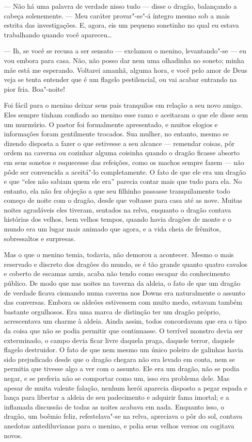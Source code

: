 --- Não há uma palavra de verdade nisso tudo --- disse o dragão,
balançando a cabeça solenemente. --- Meu caráter provar"-se"-á íntegro
mesmo sob a mais estrita das investigações. E, agora, eis um pequeno
sonetinho no qual eu estava trabalhando quando você apareceu\ldots{}

--- Ih, se você se recusa a ser sensato --- exclamou o menino,
levantando"-se --- eu vou embora para casa. Não, não posso dar nem uma
olhadinha no soneto; minha mãe está me esperando. Voltarei
amanhã, alguma hora, e você pelo amor de Deus veja se tenta entender
que é um flagelo pestilencial, ou vai acabar entrando na pior fria.
Boa"-noite!

Foi fácil para o menino deixar seus pais tranquilos em relação a seu
novo amigo. Eles sempre tinham confiado ao menino esse ramo e
aceitaram o que ele disse sem um murmúrio. O pastor foi formalmente
apresentado, e muitos elogios e informações foram gentilmente
trocados. Sua mulher, no entanto, mesmo se dizendo disposta a fazer o
que estivesse a seu alcance --- remendar coisas, pôr ordem na caverna
ou cozinhar alguma coisinha quando o dragão ficasse absorto em seus
sonetos e esquecesse das refeições, como os machos sempre fazem --- não
pôde ser convencida a aceitá"-lo completamente. O fato de que ele era
um dragão e que “eles não sabiam quem ele era” parecia contar mais
que tudo para ela. No entanto, ela não fez objeção a que seu filhinho
passasse tranquilamente todo começo de noite com o dragão, desde que
voltasse para casa até as nove. Muitas noites agradáveis eles
tiveram, sentados na relva, enquanto o dragão contava histórias dos
velhos, bem velhos tempos, quando havia dragões de monte e o mundo
era um lugar mais animado que agora, e a vida cheia de frêmitos,
sobressaltos e surpresas.

Mas o que o menino temia, todavia, não demorou a acontecer. Mesmo o
mais reservado e discreto dos dragões do mundo, se é tão grande
quanto quatro cavalos e coberto de escamas azuis, acaba não tendo
como escapar do conhecimento público. De modo que nas noites na
taverna da aldeia, o fato de que um dragão de verdade ficava cismando
numa caverna nos Downs era naturalmente o assunto das conversas.
Embora os aldeões estivessem com muito medo, estavam também bastante
orgulhosos. Era uma marca de distinção ter um dragão próprio,
acrescentava um charme à aldeia. Ainda assim, todos concordavam que
era o tipo da coisa que não se podia permitir que continuasse. O
terrível monstro devia ser exterminado, o campo devia ficar livre
daquela praga, daquele terror, daquele flagelo destruidor. O fato de
que nem mesmo um único poleiro de galinhas havia sido prejudicado
desde que o dragão chegara não era levado em conta, nem se permitia
que tivesse algo a ver com o assunto. Ele era um dragão, não se podia
negar, e se preferia não se comportar como um, isso era problema
dele. Mas apesar de muita valente falação, nenhum herói aparecia
disposto a pegar espada e lança para libertar a aldeia de seu
padecimento e adquirir fama imortal; e a inflamada discussão de todas
as noites acabava em nada. Enquanto isso, o dragão, um boêmio feliz,
refestelava"-se na relva, apreciava o pôr do sol, contava anedotas
antediluvianas para o menino, e polia seus velhos versos ou cogitava
novos.

